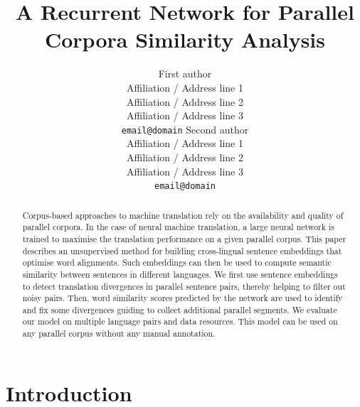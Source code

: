 \documentclass[11pt,a4paper]{article}
\title{A Recurrent Network for Parallel Corpora Similarity Analysis}
\author{%
  First author\\
  Affiliation / Address line 1\\
  Affiliation / Address line 2\\
  Affiliation / Address line 3\\
  {\tt email@domain}  
  \And
  Second author\\
  Affiliation / Address line 1\\
  Affiliation / Address line 2\\
  Affiliation / Address line 3\\
  {\tt email@domain}}
\date{}
\begin{document}
\maketitle
\begin{abstract}


Corpus-based approaches to machine translation rely on the availability and quality of parallel corpora.
In the case of neural machine translation, a large neural network is trained to maximise the translation performance on a given parallel corpus. 
This paper describes an unsupervised method for building cross-lingual sentence embeddings that optimise word alignments. 
Such embeddings can then be used to compute semantic similarity between sentences in different languages.
We first use sentence embeddings to detect translation divergences in parallel sentence pairs, thereby helping to filter out noisy pairs.
Then, word similarity scores predicted by the network are used to identify and fix some divergences guiding to collect additional parallel segments.
We evaluate our model on multiple language pairs and data resources.
This model can be used on any parallel corpus without any manual annotation.


\end{abstract}

\section{Introduction}
\end{document}
